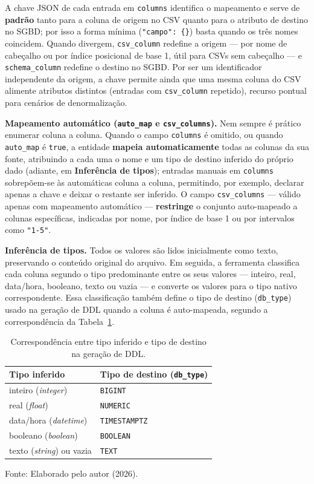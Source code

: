 A chave JSON de cada entrada em \texttt{columns} identifica o mapeamento e serve de
\textbf{padrão} tanto para a coluna de origem no CSV quanto para o atributo de destino
no SGBD; por isso a forma mínima (\texttt{"campo": \{\}}) basta quando os três nomes
coincidem. Quando divergem, \texttt{csv\_column} redefine a origem --- por nome de
cabeçalho ou por índice posicional de base 1, útil para CSVs sem cabeçalho --- e
\texttt{schema\_column} redefine o destino no SGBD. Por ser um identificador
independente da origem, a chave permite ainda que uma mesma coluna do CSV alimente
atributos distintos (entradas com \texttt{csv\_column} repetido), recurso pontual para
cenários de denormalização.

\textbf{Mapeamento automático (\texttt{auto\_map} e \texttt{csv\_columns}).} Nem sempre é
prático enumerar coluna a coluna. Quando o campo \texttt{columns} é omitido, ou quando
\texttt{auto\_map} é \texttt{true}, a entidade \textbf{mapeia automaticamente} todas as
colunas da sua fonte, atribuindo a cada uma o nome e um tipo de destino inferido do
próprio dado (adiante, em \textbf{Inferência de tipos}); entradas manuais em
\texttt{columns} sobrepõem-se às automáticas coluna a coluna, permitindo, por exemplo,
declarar apenas a chave e deixar o restante ser inferido. O campo \texttt{csv\_columns}
--- válido apenas com mapeamento automático --- \textbf{restringe} o conjunto
auto-mapeado a colunas específicas, indicadas por nome, por índice de base 1 ou por
intervalos como \texttt{"1-5"}.

\textbf{Inferência de tipos.} Todos os valores são lidos inicialmente como texto,
preservando o conteúdo original do arquivo. Em seguida, a ferramenta classifica cada
coluna segundo o tipo predominante entre os seus valores --- inteiro, real, data/hora,
booleano, texto ou vazia --- e converte os valores para o tipo nativo correspondente.
Essa classificação também define o tipo de destino (\texttt{db\_type}) usado na geração de
DDL quando a coluna é auto-mapeada, segundo a correspondência da
Tabela~\ref{tab:kinds}.

\begin{table}[H]
  \caption{Correspondência entre tipo inferido e tipo de destino na geração de DDL.}
  \label{tab:kinds}
  \centering
  \begin{tabular}{l l}
    \toprule
    \textbf{Tipo inferido} & \textbf{Tipo de destino (\texttt{db\_type})} \\
    \midrule
    inteiro (\textit{integer})   & \texttt{BIGINT} \\
    real (\textit{float})        & \texttt{NUMERIC} \\
    data/hora (\textit{datetime}) & \texttt{TIMESTAMPTZ} \\
    booleano (\textit{boolean})  & \texttt{BOOLEAN} \\
    texto (\textit{string}) ou vazia & \texttt{TEXT} \\
    \bottomrule
  \end{tabular}
  \par\vspace{4pt}
  {\footnotesize Fonte: Elaborado pelo autor (2026).}
\end{table}

